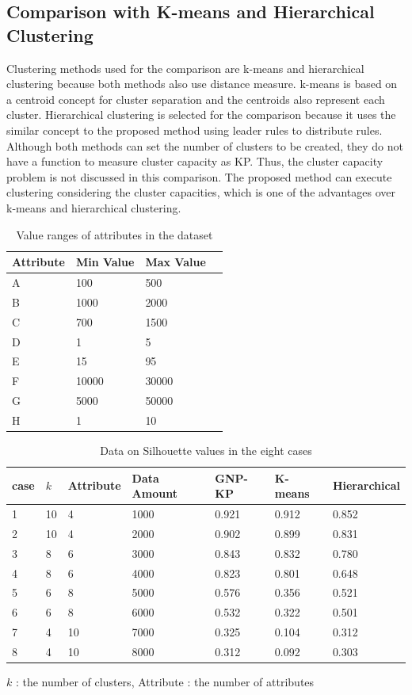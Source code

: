 \documentclass{elsart}
\begin{document}
\subsection{Comparison with K-means and Hierarchical Clustering}
Clustering methods used for the comparison are k-means and hierarchical clustering \cite{silhouette} because both methods also use distance measure. k-means is based on a centroid concept for cluster separation and the centroids also represent each cluster. Hierarchical clustering is selected for the comparison because it uses the similar concept to the proposed method using leader rules to distribute rules.
Although both methods can set the number of clusters to be created, they do not have a function to measure cluster capacity as KP. Thus, the cluster capacity problem is not discussed in this comparison.
The proposed method can execute clustering considering the cluster capacities, which is one of the advantages over k-means and hierarchical clustering.



\begin{table}[tb]
\vspace{1em}
\caption{\label{dataset-used-to-comparison}Value ranges of attributes in the dataset}
\begin{flushleft}
\begin{tabular}{|l|l|l|l|}
\hline 
Attribute & Min Value & Max Value\tabularnewline
\hline 
A & 100 & 500\tabularnewline
\hline 
B & 1000 & 2000\tabularnewline
\hline 
C & 700 & 1500\tabularnewline
\hline 
D & 1 & 5\tabularnewline
\hline 
E & 15 & 95\tabularnewline
\hline 
F & 10000 & 30000\tabularnewline
\hline 
G & 5000 & 50000\tabularnewline
\hline 
H & 1 & 10\tabularnewline
\hline 
\end{tabular}
\par\end{flushleft}
\end{table}

\begin{table}[tb]
\caption{Data on Silhouette values in the eight cases}
\label{silhouette-comparison}
\begin{flushleft}
\begin{tabular}{|l|l|l|l|l|l|l|}
\hline 
case & $k$ & Attribute & Data Amount & GNP-KP & K-means & Hierarchical \tabularnewline
\hline 
1 & 10 & 4 & 1000 & 0.921 & 0.912 & 0.852 \tabularnewline
\hline 
2 & 10 & 4 & 2000 & 0.902 & 0.899 & 0.831 \tabularnewline
\hline 
3 & 8 & 6 & 3000 & 0.843 & 0.832 & 0.780 \tabularnewline
\hline 
4 & 8 & 6 & 4000 & 0.823 & 0.801 & 0.648 \tabularnewline
\hline 
5 & 6 & 8 & 5000 & 0.576 & 0.356 & 0.521 \tabularnewline
\hline 
6 & 6 & 8 & 6000 & 0.532 & 0.322 & 0.501 \tabularnewline
\hline 
7 & 4 & 10 & 7000 & 0.325 & 0.104 & 0.312 \tabularnewline
\hline 
8 & 4 & 10 & 8000 & 0.312 & 0.092 & 0.303 \tabularnewline
\hline 
\end{tabular}


$k$ : the number of clusters,
Attribute : the number of attributes
\end{flushleft}
\end{table}
\end{document}

